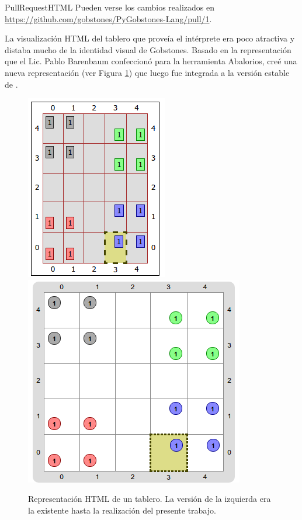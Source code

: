 \sepfootnotecontent
  {PullRequestHTML}
  {Pueden verse los cambios realizados en \url{https://github.com/gobstones/PyGobstones-Lang/pull/1}.}

La visualización HTML del tablero que proveía el intérprete era poco atractiva y distaba mucho de la identidad visual de Gobstones. Basado en la representación que el Lic. Pablo Barenbaum confeccionó para la herramienta Abalorios, creé una nueva representación (ver Figura \ref{fig:TableroHTML}) que luego fue integrada a la versión estable de \pyGob{}.

\begin{figure}
  \centering
  \includegraphics[scale=0.5]{images/tablero-html-viejo.png}
  \includegraphics[scale=0.4]{images/tablero-html-nuevo.png}

  \caption{Representación HTML de un tablero. La versión de la izquierda era la existente hasta la realización del presente trabajo.}
  \label{fig:TableroHTML}
\end{figure}

